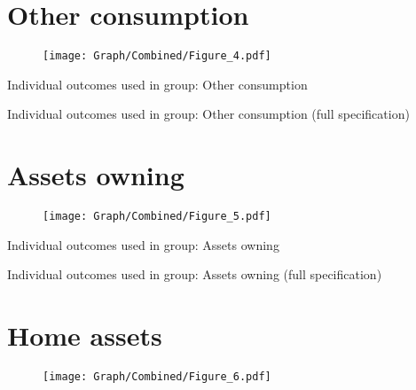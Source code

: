 \documentclass[10pt,a4paper]{article}
\begin{document}
\section{Other consumption}
\begin{table}[H]\centering

\end{table}
\begin{figure}[H]\centering
\texttt{[image: Graph/Combined/Figure\_4.pdf]}
\caption{} \label{fig:Fig_4}
\end{figure}

\begin{table}[H]\centering\caption{Individual outcomes used in group: Other consumption }
\resizebox{\textwidth}{!}{}
\end{table}
\begin{table}[H]\centering\caption{Individual outcomes used in group: Other consumption (full specification)}
\resizebox{\textwidth}{!}{}
\end{table}
\pagebreak
\section{Assets owning}
\begin{table}[H]\centering

\end{table}
\begin{figure}[H]\centering
\texttt{[image: Graph/Combined/Figure\_5.pdf]}
\caption{} \label{fig:Fig_5}
\end{figure}

\begin{table}[H]\centering\caption{Individual outcomes used in group: Assets owning }
\resizebox{\textwidth}{!}{}
\end{table}
\begin{table}[H]\centering\caption{Individual outcomes used in group: Assets owning (full specification)}
\resizebox{\textwidth}{!}{}
\end{table}
\pagebreak
\section{Home assets}
\begin{table}[H]\centering

\end{table}
\begin{figure}[H]\centering
\texttt{[image: Graph/Combined/Figure\_6.pdf]}
\caption{} \label{fig:Fig_6}
\end{figure}
\end{document}
